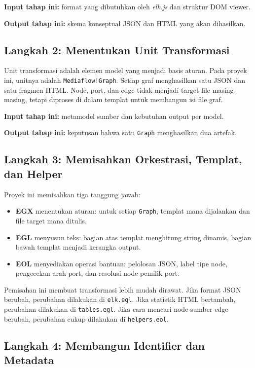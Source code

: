 \textbf{Input tahap ini:} format yang dibutuhkan oleh \textit{elk.js} dan struktur DOM viewer.

\textbf{Output tahap ini:} skema konseptual JSON dan HTML yang akan dihasilkan.

\subsection{Langkah 2: Menentukan Unit Transformasi}

Unit transformasi adalah elemen model yang menjadi basis aturan. Pada proyek ini, unitnya adalah \texttt{Mediaflow!Graph}. Setiap graf menghasilkan satu JSON dan satu fragmen HTML. Node, port, dan edge tidak menjadi target file masing-masing, tetapi diproses di dalam templat untuk membangun isi file graf.

\textbf{Input tahap ini:} metamodel sumber dan kebutuhan output per model.

\textbf{Output tahap ini:} keputusan bahwa satu \texttt{Graph} menghasilkan dua artefak.

\subsection[Langkah 3: Memisahkan Orkestrasi, Templat]{Langkah 3: Memisahkan Orkestrasi, Templat, dan Helper}

Proyek ini memisahkan tiga tanggung jawab:
\begin{itemize}
  \item \textbf{EGX} menentukan aturan: untuk setiap \texttt{Graph}, templat mana dijalankan dan file target mana ditulis.
  \item \textbf{EGL} menyusun teks: bagian atas templat menghitung string dinamis, bagian bawah templat menjadi kerangka output.
  \item \textbf{EOL} menyediakan operasi bantuan: pelolosan JSON, label tipe node, pengecekan arah port, dan resolusi node pemilik port.
\end{itemize}

Pemisahan ini membuat transformasi lebih mudah dirawat. Jika format JSON berubah, perubahan dilakukan di \texttt{elk.egl}. Jika statistik HTML bertambah, perubahan dilakukan di \texttt{tables.egl}. Jika cara mencari node sumber edge berubah, perubahan cukup dilakukan di \texttt{helpers.eol}.

\subsection{Langkah 4: Membangun Identifier dan Metadata}

